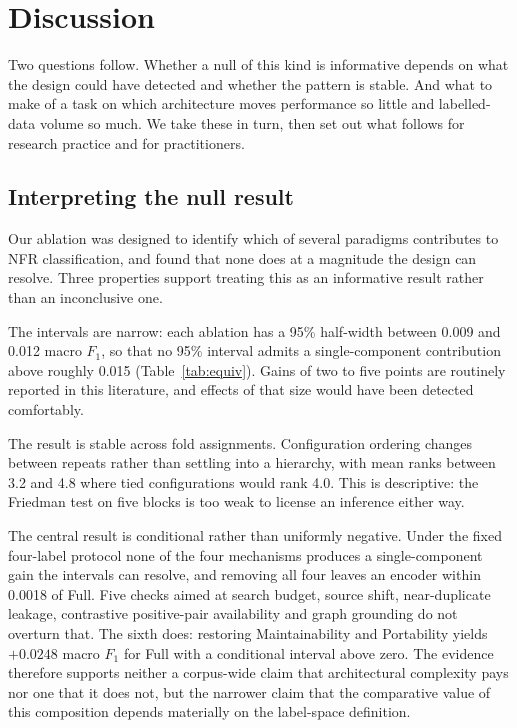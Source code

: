 \documentclass[11pt,a4paper]{article}
\begin{document}
\section{Discussion}
\label{sec:discussion}

Two questions follow. Whether a null of this kind is informative depends on what the design could have detected and whether the pattern is stable. And what to make of a task on which architecture moves performance so little and labelled-data volume so much. We take these in turn, then set out what follows for research practice and for practitioners.

\subsection{Interpreting the null result}

Our ablation was designed to identify which of several paradigms contributes to NFR
classification, and found that none does at a magnitude the design can resolve. Three
properties support treating this as an informative result rather than an inconclusive one.

The intervals are narrow: each ablation has a 95\% half-width between 0.009 and 0.012 macro
$F_1$, so that no 95\% interval admits a single-component contribution above roughly 0.015 (Table~\ref{tab:equiv}). Gains of two to five points are routinely reported in this literature, and effects of that size would have been detected comfortably.

The result is stable across fold assignments. Configuration ordering changes between repeats rather than settling into a hierarchy, with mean ranks between 3.2 and 4.8 where tied configurations would rank 4.0. This is descriptive: the Friedman test on five blocks is too weak to license an inference either way.

The central result is conditional rather than uniformly negative. Under the fixed four-label protocol none
of the four mechanisms produces a single-component gain the intervals can resolve, and removing all four
leaves an encoder within 0.0018 of Full. Five checks aimed at search budget, source shift, near-duplicate
leakage, contrastive positive-pair availability and graph grounding do not overturn that. The sixth does:
restoring Maintainability and Portability yields $+0.0248$ macro $F_1$ for Full with a conditional interval
above zero. The evidence therefore supports neither a corpus-wide claim that architectural complexity pays
nor one that it does not, but the narrower claim that the comparative value of this composition depends
materially on the label-space definition.
\end{document}
